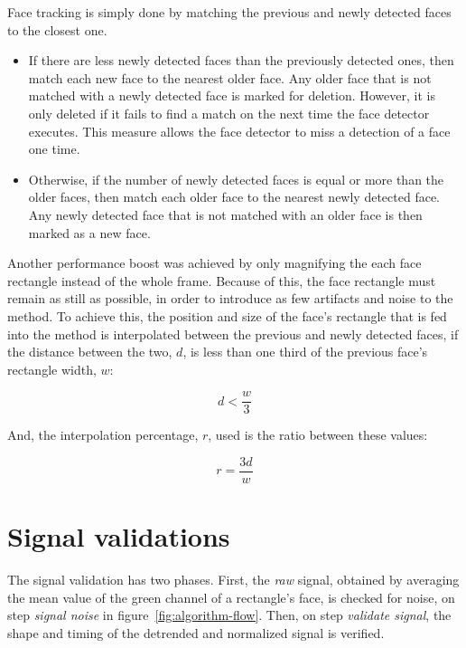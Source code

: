 Face tracking is simply done by matching the previous and newly detected faces
to the closest one.
\begin{itemize}
  \item If there are less newly detected faces than the previously detected
        ones, then match each new face to the nearest older face. Any older
        face that is not matched with a newly detected face is marked for
        deletion. However, it is only deleted if it fails to find a match
        on the next time the face detector executes. This measure allows the
        face detector to miss a detection of a face one time.
  \item Otherwise, if the number of newly detected faces is equal or more than
        the older faces, then match each older face to the nearest newly
        detected face. Any newly detected face that is not matched with an
        older face is then marked as a new face.
\end{itemize}

Another performance boost was achieved by only magnifying the each face
rectangle instead of the whole frame. Because of this, the face rectangle must
remain as still as possible, in order to introduce as few artifacts and noise
to the \evm{} method. To achieve this, the position and size of the face's
rectangle that is fed into the \evm{} method is interpolated between the
previous and newly detected faces, if the distance between the two, $d$,
is less than one third of the previous face's rectangle width, $w$:

\begin{equation}
  d < \frac{w}{3}
\end{equation}

And, the interpolation percentage, $r$, used is the ratio between these values:

\begin{equation}
  r = \frac{3d}{w}
\end{equation}

\section{Signal validations} \label{sec:impl:validations}

The signal validation has two phases. First, the \emph{raw} signal,
obtained by averaging the mean value of the green channel of
a rectangle's face, is checked for noise,
on step \emph{signal noise} in figure~\ref{fig:algorithm-flow}.
Then, on step \emph{validate signal}, the shape and timing of the detrended
and normalized signal is verified.

